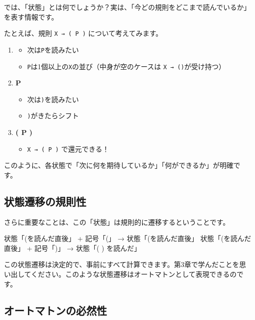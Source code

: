 では、「状態」とは何でしょうか？実は、「今どの規則をどこまで読んでいるか」を表す情報です。

たとえば、規則 \texttt{X\ →\ (\ P\ )} について考えてみます。

\begin{enumerate}
\item

  \begin{itemize}
  \item
    次は\texttt{P}を読みたい
  \item
    \texttt{P}は1個以上の\texttt{X}の並び（中身が空のケースは
    \texttt{X\ →\ ()}が受け持つ）
  \end{itemize}
\item
  \textbf{\sffamily P}

  \begin{itemize}
  \item
    次は\texttt{)}を読みたい
  \item
    \texttt{)}がきたらシフト
  \end{itemize}
\item
  \textbf{\sffamily ( P )}

  \begin{itemize}
  \item
    \texttt{X\ →\ (\ P\ )} で還元できる！
  \end{itemize}
\end{enumerate}

このように、各状態で「次に何を期待しているか」「何ができるか」が明確です。

\subsection{状態遷移の規則性}

さらに重要なことは、この「状態」は規則的に遷移するということです。

\begin{codescreen}{}
状態「(を読んだ直後」 + 記号「(」 → 状態「(を読んだ直後」
状態「(を読んだ直後」 + 記号「)」 → 状態「( ) を読んだ」
\end{codescreen}

この状態遷移は決定的で、事前にすべて計算できます。第3章で学んだことを思い出してください。このような状態遷移はオートマトンとして表現できるのです。

\subsection{オートマトンの必然性}


